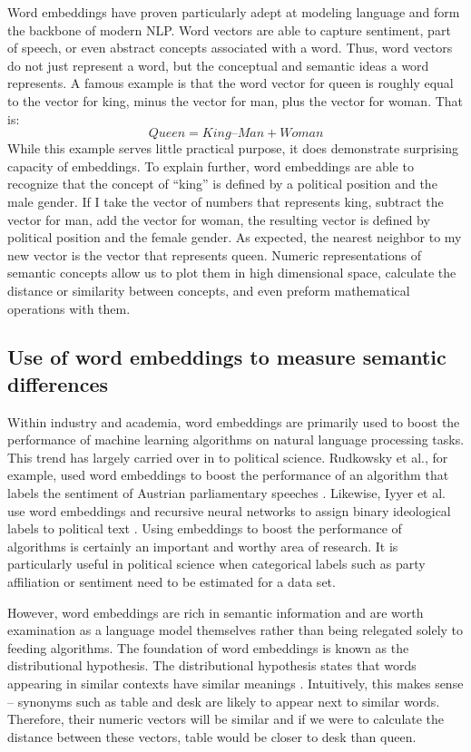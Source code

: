 \documentclass[../embeddings.tex]{subfiles}
\begin{document}
Word embeddings have proven particularly adept at modeling language and form the backbone of modern NLP. Word vectors are able to capture sentiment, part of speech, or even abstract concepts associated with a word. Thus, word vectors do not just represent a word, but the conceptual and semantic ideas a word represents. A famous example is that the word vector for queen is roughly equal to the vector for king, minus the vector for man, plus the vector for woman. That is:
\begin{equation}
Queen = King – Man + Woman
\end{equation}
While this example serves little practical purpose, it does demonstrate surprising capacity of embeddings. To explain further, word embeddings are able to recognize that the concept of “king” is defined by a political position and the male gender. If I take the vector of numbers that represents king, subtract the vector for man, add the vector for woman, the resulting vector is defined by political position and the female gender. As expected, the nearest neighbor to my new vector is the vector that represents queen. Numeric representations of semantic concepts allow us to plot them in high dimensional space, calculate the distance or similarity between concepts, and even preform mathematical operations with them.

\subsection{Use of word embeddings to measure semantic differences}
Within industry and academia, word embeddings are primarily used to boost the performance of machine learning algorithms on natural language processing tasks. This trend has largely carried over in to political science. Rudkowsky et al., for example, used word embeddings to boost the performance of an algorithm that labels the sentiment of Austrian parliamentary speeches \cite{rudkowsky2018more}. Likewise, Iyyer et al. use word embeddings and recursive neural networks to assign binary ideological labels to political text \cite{iyyer2014political}. Using embeddings to boost the performance of algorithms is certainly an important and worthy area of research. It is particularly useful in political science when categorical labels such as party affiliation or sentiment need to be estimated for a data set. 

However, word embeddings are rich in semantic information and are worth examination as a language model themselves rather than being relegated solely to feeding algorithms. The foundation of word embeddings is known as the distributional hypothesis. The distributional hypothesis states that words appearing in similar contexts have similar meanings \cite{goldberg2014word2vec, mikolov2013efficient}. Intuitively, this makes sense – synonyms such as table and desk are likely to appear next to similar words. Therefore, their numeric vectors will be similar and if we were to calculate the distance between these vectors, table would be closer to desk than queen. 
\end{document}
